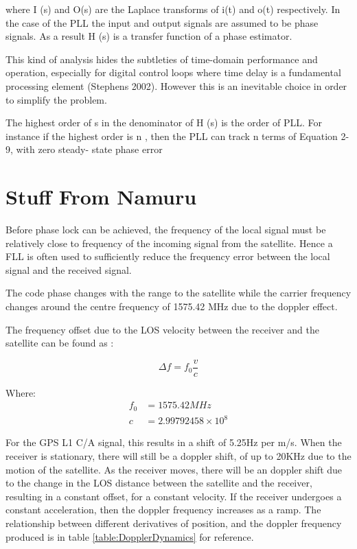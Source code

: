 where I (s) and O(s) are the Laplace transforms of i(t) and o(t) respectively. In the case of the PLL the input and output signals are assumed to be phase signals. As a result
H (s) is a transfer function of a phase estimator.


This kind of analysis hides the subtleties of time-domain performance and operation, especially for digital control loops where time delay is a fundamental processing element (Stephens 2002). However this is an inevitable choice in order to simplify the problem.

The highest order of s in the denominator of H (s) is the order of PLL. For instance if the
highest order is n , then the PLL can track n terms of Equation 2-9, with zero steady- state phase error

\section{Stuff From Namuru}
Before phase lock can be achieved, the frequency of the local signal must be relatively close to frequency of the incoming signal from the satellite. Hence a \ac{FLL} is often used to sufficiently reduce the frequency error between the local signal and the received signal.

The code phase changes with the range to the satellite while the carrier frequency changes around the centre frequency of 1575.42 MHz due to the doppler effect\cite{Tsui}.

The frequency offset due to the \ac{LOS} velocity between the receiver and the satellite can be found as : 

\begin{equation}
\Delta f = f_0\frac{v}{c}
\end{equation}

Where: 
\begin{align*}
f_0 &= 1575.42 MHz\\   
c &= 2.99792458 \times 10^8
\end{align*}

For the GPS L1 \ac{C/A} signal, this results in a shift of 5.25Hz per m/s. 
When the receiver is stationary, there will still be a doppler shift, of up to 20KHz due to the motion of the satellite\cite{Kaplan}. As the receiver moves, there will be an doppler shift due to the change in the \ac{LOS} distance between the satellite and the receiver, resulting in a constant offset, for a constant velocity. If the receiver undergoes a constant acceleration, then the doppler frequency increases as a ramp. The relationship between different derivatives of position, and the doppler frequency produced is in table \ref{table:DopplerDynamics} for reference.

